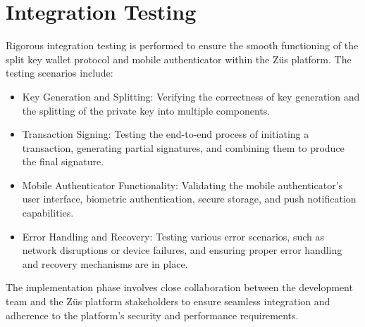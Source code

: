 \section{Integration Testing}
Rigorous integration testing is performed to ensure the smooth functioning of the split key wallet protocol and mobile authenticator within the Züs platform. The testing scenarios include:
\begin{itemize}
    \item Key Generation and Splitting: Verifying the correctness of key generation and the splitting of the private key into multiple components.
    \item Transaction Signing: Testing the end-to-end process of initiating a transaction, generating partial signatures, and combining them to produce the final signature.
    \item Mobile Authenticator Functionality: Validating the mobile authenticator's user interface, biometric authentication, secure storage, and push notification capabilities.
    \item Error Handling and Recovery: Testing various error scenarios, such as network disruptions or device failures, and ensuring proper error handling and recovery mechanisms are in place.
\end{itemize}

The implementation phase involves close collaboration between the development team and the Züs platform stakeholders to ensure seamless integration and adherence to the platform's security and performance requirements.
